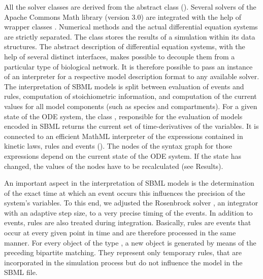\documentclass[10pt]{bmc_article}
\newenvironment{bmcformat}{\begin{raggedright}\baselineskip20pt\sloppy\setboolean{publ}{false}}{\end{raggedright}\baselineskip20pt\sloppy}
\begin{document}
\begin{bmcformat}
All the solver classes are derived from the abstract class \AbstractDESSolver ().
Several solvers of the Apache Commons Math library (version 3.0) are integrated with the help of wrapper classes .
Numerical methods and the actual differential equation systems are strictly separated.
The class \MultiTable stores the results of a simulation within its \Block data structures. 
%
The abstract description of differential equation systems, with the help of
several distinct interfaces, makes  possible to decouple them from a
particular type of biological network.
It is therefore possible to pass an instance of an interpreter for a respective
model description format to any available solver.
%
The interpretation of \acs{SBML} models is split between evaluation of events
and rules, computation of stoichiometric information, and computation of the
current values for all model components (such as species and compartments).
%
For a given state of the \acs{ODE} system, the class \SBMLinterpreter,
responsible for the evaluation of models encoded in \acs{SBML}\COR{,} returns
the current set of time-derivatives of the variables.
It is connected to an efficient MathML interpreter of the expressions contained
in kinetic laws, rules and events (\ASTNodeInterpreter).
The nodes of the syntax graph for those expressions depend on the current state
of the \acs{ODE} system.
If the state has changed, the values of the nodes have to be recalculated (see
Results).

%
An important aspect in the interpretation of \acs{SBML} models is the
determination of the exact time at which an event occurs 
this influences the precision of the system's variables.
To this end, we adjusted  the Rosenbrock solver
\cite{Kotcon2011},
an integrator with an adaptive step size, to a very precise timing of the
events.
In addition to events, rules are also treated during integration.
Basically, rules are  events that occur at every given point
in time and are therefore processed in the same manner.
For every object of the type \AlgebraicRule, a new \AssignmentRule object is
generated by means of the preceding bipartite matching.
They represent only temporary rules, that are incorporated in the simulation
process but do not influence the model in the \acs{SBML} file.
%


\end{bmcformat}
\end{document}
